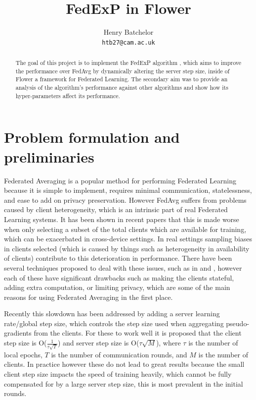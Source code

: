\documentclass{article}
\title{FedExP in Flower}
\author{%
  Henry Batchelor\\
  \texttt{htb27@cam.ac.uk} \\
}
\begin{document}
\maketitle

\begin{abstract}
  The goal of this project is to implement the FedExP algorithm \cite{FedExP}, which aims to improve the performance over FedAvg by dynamically altering the server step size, inside of Flower \cite{flower} a framework for Federated Learning.  The secondary aim was to provide an analysis of the algorithm's performance against other algorithms and show how its hyper-parameters affect its performance.
\end{abstract}

\section{Problem formulation and preliminaries}

Federated Averaging is a popular method for performing Federated Learning because it is simple to implement, requires minimal communication, statelessness, and ease to add on privacy preservation.  However FedAvg suffers from problems caused by client heterogeneity, which is an intrinsic part of real Federated Learning systems.  It has been shown in recent papers \cite{FewerClientsWorseBehaviour} that this is made worse when only selecting a subset of the total clients which are available for training, which can be exacerbated in cross-device settings.  In real settings sampling biases in clients selected (which is caused by things such as heterogeneity in availability of clients) contribute to this deterioration in performance.  There have been several techniques proposed to deal with these issues, such as in \cite{signSGD} and \cite{ProxSkip}, however each of these have significant drawbacks such as making the clients stateful, adding extra computation, or limiting privacy, which are some of the main reasons for using Federated Averaging in the first place.  

Recently this slowdown has been addressed by adding a server learning rate/global step size, which controls the step size used when aggregating pseudo-gradients from the clients. \cite{AdaptiveFederatedOptimisation}  For these to work well it is proposed that the client step size is O($\frac{1}{\tau\sqrt{T}}$) and server step size is O($\tau\sqrt{M}$), where $\tau$ is the number of local epochs, $T$ is the number of communication rounds, and $M$ is the number of clients.  In practice however these do not lead to great results because the small client step size impacts the speed of training heavily, which cannot be fully compensated for by a large server step size, this is most prevalent in the initial rounds.
\end{document}
